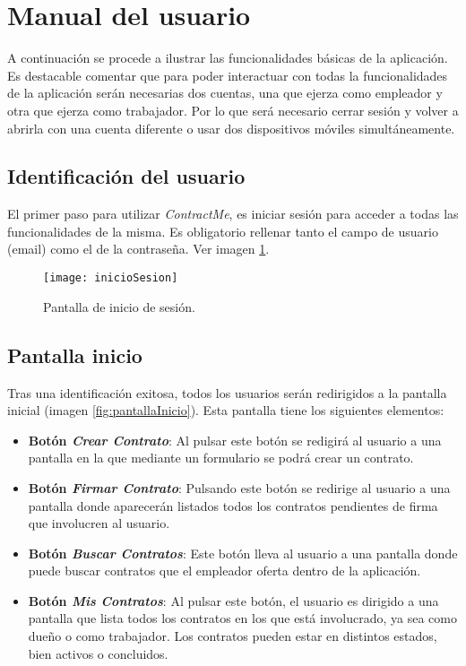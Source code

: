 \section{Manual del usuario}

A continuación se procede a ilustrar las funcionalidades básicas de la aplicación. Es destacable comentar que para poder interactuar con todas la funcionalidades de la aplicación serán necesarias dos cuentas, una que ejerza como empleador y otra que ejerza como trabajador. Por lo que será necesario cerrar sesión y volver a abrirla con una cuenta diferente o usar dos dispositivos móviles simultáneamente.

\subsection{Identificación del usuario}

El primer paso para utilizar \textit{ContractMe}, es iniciar sesión para acceder a todas las funcionalidades de la misma. Es obligatorio rellenar tanto el campo de usuario (email) como el de la contraseña.
Ver imagen \ref{fig:inicioSesion}.

\begin{figure}[h]
	\centering
	\texttt{[image: inicioSesion]}
	\caption[Pantalla inicio sesión]{Pantalla de inicio de sesión.}
	\label{fig:inicioSesion}
\end{figure}

\subsection{Pantalla inicio}

Tras una identificación exitosa, todos los usuarios serán redirigidos a la pantalla inicial (imagen \ref{fig:pantallaInicio}). Esta pantalla tiene los siguientes elementos:

\begin{itemize}

\item \textbf{Botón \textit{Crear Contrato}}: Al pulsar este botón se redigirá al usuario a una pantalla en la que mediante un formulario se podrá crear un contrato.

\item \textbf{Botón \textit{Firmar Contrato}}: Pulsando este botón se redirige al usuario a una pantalla donde aparecerán listados todos los contratos pendientes de firma que involucren al usuario.

\item \textbf{Botón \textit{Buscar Contratos}}: Este botón lleva al usuario a una pantalla donde puede buscar contratos que el empleador oferta dentro de la aplicación. 

\item \textbf{Botón \textit{Mis Contratos}}: Al pulsar este botón, el usuario es dirigido a una pantalla que lista todos los contratos en los que está involucrado, ya sea como dueño o como trabajador.
Los contratos pueden estar en distintos estados, bien activos o concluidos.

\end{itemize}

